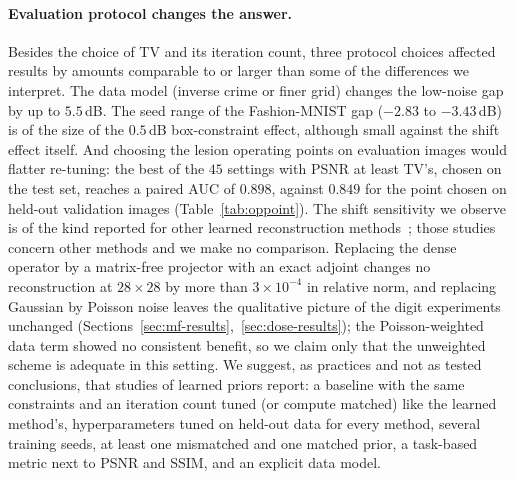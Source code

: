 \paragraph{Evaluation protocol changes the answer.}
Besides the choice of TV and its iteration count, three protocol choices affected results by amounts comparable to or larger than some of the differences we interpret. The data model (inverse crime or finer grid) changes the low-noise gap by up to $5.5$\,dB. The seed range of the Fashion-MNIST gap ($-2.83$ to $-3.43$\,dB) is of the size of the $0.5$\,dB box-constraint effect, although small against the shift effect itself. And choosing the lesion operating points on evaluation images would flatter re-tuning: the best of the $45$ settings with PSNR at least TV's, chosen on the test set, reaches a paired AUC of $0.898$, against $0.849$ for the point chosen on held-out validation images (Table~\ref{tab:oppoint}).
The shift sensitivity we observe is of the kind reported for other learned reconstruction methods~\citep{darestani2021shift}; those studies concern other methods and we make no comparison. Replacing the dense operator by a matrix-free projector with an exact adjoint changes no reconstruction at $28\times28$ by more than $3\times10^{-4}$ in relative norm, and replacing Gaussian by Poisson noise leaves the qualitative picture of the digit experiments unchanged (Sections~\ref{sec:mf-results},~\ref{sec:dose-results}); the Poisson-weighted data term showed no consistent benefit, so we claim only that the unweighted scheme is adequate in this setting.
We suggest, as practices and not as tested conclusions, that studies of learned priors report: a baseline with the same constraints and an iteration count tuned (or compute matched) like the learned method's, hyperparameters tuned on held-out data for every method, several training seeds, at least one mismatched and one matched prior, a task-based metric next to PSNR and SSIM, and an explicit data model.